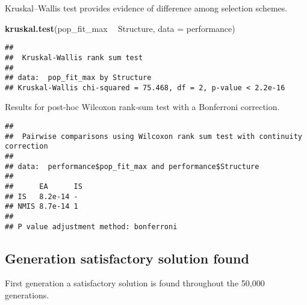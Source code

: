 \documentclass[]{book}
\newenvironment{Shaded}{\begin{snugshade}}{\end{snugshade}}
\newcommand{\DataTypeTok}[1]{\textcolor[rgb]{0.13,0.29,0.53}{#1}}
\newcommand{\KeywordTok}[1]{\textcolor[rgb]{0.13,0.29,0.53}{\textbf{#1}}}
\newcommand{\NormalTok}[1]{#1}
\newcommand{\OperatorTok}[1]{\textcolor[rgb]{0.81,0.36,0.00}{\textbf{#1}}}
\newcommand{\OtherTok}[1]{\textcolor[rgb]{0.56,0.35,0.01}{#1}}
\newcommand{\StringTok}[1]{\textcolor[rgb]{0.31,0.60,0.02}{#1}}
\begin{document}
Kruskal--Wallis test provides evidence of difference among selection schemes.

\begin{Shaded}
\begin{Highlighting}[]
\KeywordTok{kruskal.test}\NormalTok{(pop_fit_max }\OperatorTok{~}\StringTok{ }\NormalTok{Structure, }\DataTypeTok{data =}\NormalTok{ performance)}
\end{Highlighting}
\end{Shaded}

\begin{verbatim}
## 
##  Kruskal-Wallis rank sum test
## 
## data:  pop_fit_max by Structure
## Kruskal-Wallis chi-squared = 75.468, df = 2, p-value < 2.2e-16
\end{verbatim}

Results for post-hoc Wilcoxon rank-sum test with a Bonferroni correction.

\begin{Shaded}
\end{Shaded}

\begin{verbatim}
## 
##  Pairwise comparisons using Wilcoxon rank sum test with continuity correction 
## 
## data:  performance$pop_fit_max and performance$Structure 
## 
##      EA      IS
## IS   8.2e-14 - 
## NMIS 8.7e-14 1 
## 
## P value adjustment method: bonferroni
\end{verbatim}

\hypertarget{generation-satisfactory-solution-found-22}{%
\subsection{Generation satisfactory solution found}\label{generation-satisfactory-solution-found-22}}

First generation a satisfactory solution is found throughout the 50,000 generations.
\end{document}
